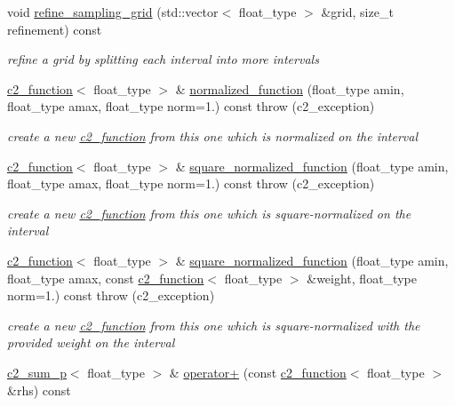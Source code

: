 \begin{DoxyCompactItemize}
void \hyperlink{classc2__function_a25004cf23f56fafd0b64901354892f3c}{refine\+\_\+sampling\+\_\+grid} (std\+::vector$<$ float\+\_\+type $>$ \&grid, size\+\_\+t refinement) const 
\begin{DoxyCompactList}\small\item\em refine a grid by splitting each interval into more intervals \end{DoxyCompactList}\item 
\hyperlink{classc2__function}{c2\+\_\+function}$<$ float\+\_\+type $>$ \& \hyperlink{classc2__function_ad908929d3a8d8022caf4f3f1c65d5e71}{normalized\+\_\+function} (float\+\_\+type amin, float\+\_\+type amax, float\+\_\+type norm=1.) const   throw (c2\+\_\+exception)
\begin{DoxyCompactList}\small\item\em create a new \hyperlink{classc2__function}{c2\+\_\+function} from this one which is normalized on the interval \end{DoxyCompactList}\item 
\hyperlink{classc2__function}{c2\+\_\+function}$<$ float\+\_\+type $>$ \& \hyperlink{classc2__function_adcf8bcc841ca3a1155ae115178ea88af}{square\+\_\+normalized\+\_\+function} (float\+\_\+type amin, float\+\_\+type amax, float\+\_\+type norm=1.) const   throw (c2\+\_\+exception)
\begin{DoxyCompactList}\small\item\em create a new \hyperlink{classc2__function}{c2\+\_\+function} from this one which is square-\/normalized on the interval \end{DoxyCompactList}\item 
\hyperlink{classc2__function}{c2\+\_\+function}$<$ float\+\_\+type $>$ \& \hyperlink{classc2__function_a9d8716e8abb9e02a188c243f825acf9b}{square\+\_\+normalized\+\_\+function} (float\+\_\+type amin, float\+\_\+type amax, const \hyperlink{classc2__function}{c2\+\_\+function}$<$ float\+\_\+type $>$ \&weight, float\+\_\+type norm=1.) const   throw (c2\+\_\+exception)
\begin{DoxyCompactList}\small\item\em create a new \hyperlink{classc2__function}{c2\+\_\+function} from this one which is square-\/normalized with the provided {\itshape weight} on the interval \end{DoxyCompactList}\item 
\hyperlink{classc2__sum__p}{c2\+\_\+sum\+\_\+p}$<$ float\+\_\+type $>$ \& \hyperlink{classc2__function_a268b206b47c55e635e5f0a9e0f3e8ded}{operator+} (const \hyperlink{classc2__function}{c2\+\_\+function}$<$ float\+\_\+type $>$ \&rhs) const 

\end{DoxyCompactItemize}
